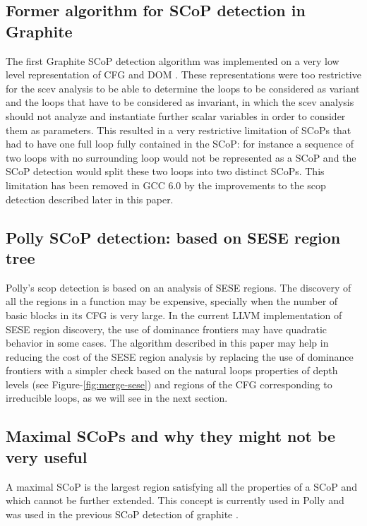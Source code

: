 \documentclass{sigplanconf}
\begin{document}
\subsection{Former algorithm for SCoP detection in Graphite}

The first Graphite SCoP detection algorithm was implemented on a very low level
representation of CFG and DOM \cite{trifunovic}.  These representations were
too restrictive for
the scev analysis to be able to determine the loops to be considered as variant
and the loops that have to be considered as invariant, in which the scev
analysis should not analyze and instantiate further scalar variables in order to
consider them as parameters.  This resulted in a very restrictive limitation of
SCoPs that had to have one full loop fully contained in the SCoP: for instance a
sequence of two loops with no surrounding loop would not be represented as a
SCoP and the SCoP detection would split these two loops into two distinct SCoPs.
This limitation has been removed in GCC 6.0 by the improvements to the scop
detection described later in this paper.

\subsection{Polly SCoP detection: based on SESE region tree}

Polly's scop detection is based on an analysis of SESE regions.  The discovery
of all the regions in a function may be expensive, specially when the number of
basic blocks in its CFG is very large.  In the current LLVM implementation of
SESE region discovery, the use of dominance frontiers may have quadratic
behavior in some cases.  The algorithm described in this paper may help in
reducing the cost of the SESE region analysis by replacing the use of dominance
frontiers with a simpler check based on the natural loops properties of depth
levels (see Figure-\ref{fig:merge-sese}) and regions of the CFG corresponding to
irreducible loops, as we will see in the next section.

\subsection{Maximal SCoPs and why they might not be very useful}
\label{subsec:maximality}
A maximal SCoP is the largest region satisfying all the properties of a SCoP and
which cannot be further extended.  This concept is currently used in Polly
\cite{polly} and was used in the previous SCoP detection of graphite
\cite{graphite}.
\end{document}
